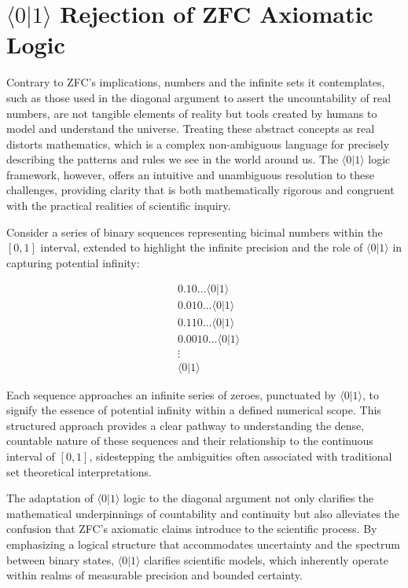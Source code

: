 \documentclass[12pt]{article}
\newcommand{\qbit}{\ensuremath{\langle 0 | 1 \rangle}}
\begin{document}
\section*{\(\qbit\) Rejection of ZFC Axiomatic Logic}

Contrary to ZFC's implications, numbers and the infinite sets it contemplates, such as those used in the diagonal argument to assert the uncountability of real numbers, are not tangible elements of reality but tools created by humans to model and understand the universe. Treating these abstract concepts as real distorts mathematics, which is a complex non-ambiguous language for precisely describing the patterns and rules we see in the world around us. The \(\qbit\) logic framework, however, offers an intuitive and unambiguous resolution to these challenges, providing clarity that is both mathematically rigorous and congruent with the practical realities of scientific inquiry.

Consider a series of binary sequences representing bicimal numbers within the \([0,1]\) interval, extended to highlight the infinite precision and the role of \(\qbit\) in capturing potential infinity:

\begin{align*}
     & 0.10\ldots\qbit   \\
     & 0.010\ldots\qbit  \\
     & 0.110\ldots\qbit  \\
     & 0.0010\ldots\qbit \\
     & \vdots            \\
     & \qbit
\end{align*}

Each sequence approaches an infinite series of zeroes, punctuated by \(\qbit\), to signify the essence of potential infinity within a defined numerical scope. This structured approach provides a clear pathway to understanding the dense, countable nature of these sequences and their relationship to the continuous interval of \([0,1]\), sidestepping the ambiguities often associated with traditional set theoretical interpretations.

The adaptation of \(\qbit\) logic to the diagonal argument not only clarifies the mathematical underpinnings of countability and continuity but also alleviates the confusion that ZFC's  axiomatic claims introduce to the scientific process. By emphasizing a logical structure that accommodates uncertainty and the spectrum between binary states, \(\qbit\) clarifies scientific models, which inherently operate within realms of measurable precision and bounded certainty.
\end{document}
